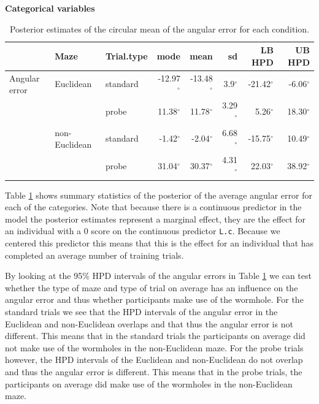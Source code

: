 \documentclass[11pt,]{article}
\begin{document}
\textbf{Categorical variables}

\begin{table}
\centering
\caption{Posterior estimates of the circular mean of the angular error for each condition.} 
\begin{tabular}{lllrrrrr}
  \hline\noalign{\smallskip}
& Maze & Trial.type & mode & mean & sd & LB HPD & UB HPD  \\ \hline\noalign{\smallskip}
Angular error   & Euclidean     & standard & -12.97$^{\circ}$ & -13.48$^{\circ}$ & 3.9$^{\circ}$ & -21.42$^{\circ}$ & -6.06$^{\circ}$\\
              &                   & probe    &  11.38$^{\circ}$ & 11.78$^{\circ}$ & 3.29$^{\circ}$ & 5.26$^{\circ}$ & 18.30$^{\circ}$   \\
                & non-Euclidean & standard & -1.42$^{\circ}$  & -2.04$^{\circ}$  & 6.68$^{\circ}$ & -15.75$^{\circ}$ & 10.49$^{\circ}$ \\
              &                   & probe    &  31.04$^{\circ}$ & 30.37$^{\circ}$ & 4.31$^{\circ}$ & 22.03$^{\circ}$ & 38.92$^{\circ}$ \\
   \hline
\end{tabular}
\label{TableResMaps}
\end{table}

Table \ref{TableResMaps} shows summary statistics of the posterior of
the average angular error for each of the categories. Note that because
there is a continuous predictor in the model the posterior estimates
represent a marginal effect, they are the effect for an individual with
a 0 score on the continuous predictor \verb|L.c|. Because we centered
this predictor this means that this is the effect for an individual that
has completed an average number of training trials.

By looking at the 95\(\%\) HPD intervals of the angular errors in Table
\ref{TableResMaps} we can test whether the type of maze and type of
trial on average has an influence on the angular error and thus whether
participants make use of the wormhole. For the standard trials we see
that the HPD intervals of the angular error in the Euclidean and
non-Euclidean overlaps and that thus the angular error is not different.
This means that in the standard trials the participants on average did
not make use of the wormholes in the non-Euclidean maze. For the probe
trials however, the HPD intervals of the Euclidean and non-Euclidean do
not overlap and thus the angular error is different. This means that in
the probe trials, the participants on average did make use of the
wormholes in the non-Euclidean maze.
\end{document}
